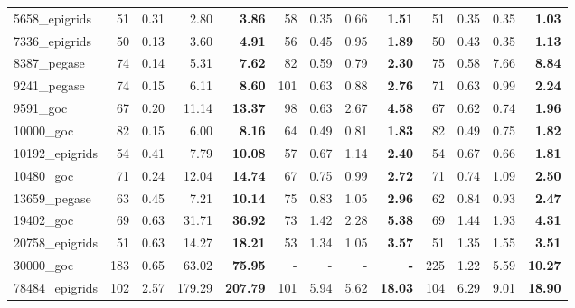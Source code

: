 \begin{tabular}{|l|rrr >{\bfseries}r|rrr >{\bfseries}r|rrr >{\bfseries}r|}
      5658\_epigrids & 51 & 0.31 & 2.80 & 3.86 & 58 & 0.35 & 0.66 & 1.51 & 51 & 0.35 & 0.35 & 1.03 \\
      7336\_epigrids & 50 & 0.13 & 3.60 & 4.91 & 56 & 0.45 & 0.95 & 1.89 & 50 & 0.43 & 0.35 & 1.13 \\
      8387\_pegase & 74 & 0.14 & 5.31 & 7.62 & 82 & 0.59 & 0.79 & 2.30 & 75 & 0.58 & 7.66 & 8.84 \\
      \hline
      9241\_pegase & 74 & 0.15 & 6.11 & 8.60 & 101 & 0.63 & 0.88 & 2.76 & 71 & 0.63 & 0.99 & 2.24 \\
      9591\_goc & 67 & 0.20 & 11.14 & 13.37 & 98 & 0.63 & 2.67 & 4.58 & 67 & 0.62 & 0.74 & 1.96 \\
      10000\_goc & 82 & 0.15 & 6.00 & 8.16 & 64 & 0.49 & 0.81 & 1.83 & 82 & 0.49 & 0.75 & 1.82 \\
      10192\_epigrids & 54 & 0.41 & 7.79 & 10.08 & 57 & 0.67 & 1.14 & 2.40 & 54 & 0.67 & 0.66 & 1.81 \\
      10480\_goc & 71 & 0.24 & 12.04 & 14.74 & 67 & 0.75 & 0.99 & 2.72 & 71 & 0.74 & 1.09 & 2.50 \\
      \hline
      13659\_pegase & 63 & 0.45 & 7.21 & 10.14 & 75 & 0.83 & 1.05 & 2.96 & 62 & 0.84 & 0.93 & 2.47 \\
      19402\_goc & 69 & 0.63 & 31.71 & 36.92 & 73 & 1.42 & 2.28 & 5.38 & 69 & 1.44 & 1.93 & 4.31 \\
      20758\_epigrids & 51 & 0.63 & 14.27 & 18.21 & 53 & 1.34 & 1.05 & 3.57 & 51 & 1.35 & 1.55 & 3.51 \\
      30000\_goc & 183 & 0.65 & 63.02 & 75.95 & - & - & - & - & 225 & 1.22 & 5.59 & 10.27 \\
      78484\_epigrids & 102 & 2.57 & 179.29 & 207.79 & 101 & 5.94 & 5.62 & 18.03 & 104 & 6.29 & 9.01 & 18.90 \\
      \hline
    \end{tabular}

